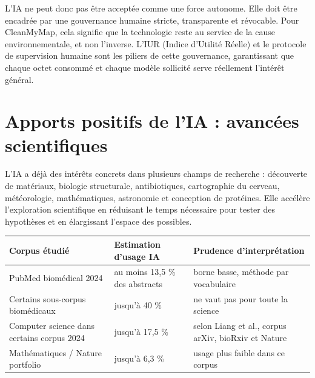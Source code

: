\documentclass[
  10pt,
  a4paper,
  DIV=11,
  numbers=noendperiod,
  oneside]{scrreprt}
\newcounter{none} %
\begin{document}
L'IA ne peut donc pas être acceptée comme une force autonome. Elle doit
être encadrée par une gouvernance humaine stricte, transparente et
révocable. Pour CleanMyMap, cela signifie que la technologie reste au
service de la cause environnementale, et non l'inverse. L'IUR (Indice
d'Utilité Réelle) et le protocole de supervision humaine sont les
piliers de cette gouvernance, garantissant que chaque octet consommé et
chaque modèle sollicité serve réellement l'intérêt général.

\section{Apports positifs de l'IA : avancées
scientifiques}\label{apports-positifs-de-lia-avancuxe9es-scientifiques}

L'IA a déjà des intérêts concrets dans plusieurs champs de recherche :
découverte de matériaux, biologie structurale, antibiotiques,
cartographie du cerveau, météorologie, mathématiques, astronomie et
conception de protéines. Elle accélère l'exploration scientifique en
réduisant le temps nécessaire pour tester des hypothèses et en
élargissant l'espace des possibles.

{\def\LTcaptype{none} %
\begin{longtable}[]{@{}
  >{\raggedright\arraybackslash}p{}
  >{\raggedleft\arraybackslash}p{}
  >{\raggedright\arraybackslash}p{}@{}}
\toprule\noalign{}
\begin{minipage}[b]{\linewidth}\raggedright
Corpus étudié
\end{minipage} & \begin{minipage}[b]{\linewidth}\raggedleft
Estimation d'usage IA
\end{minipage} & \begin{minipage}[b]{\linewidth}\raggedright
Prudence d'interprétation
\end{minipage} \\
\midrule\noalign{}
\endhead
\bottomrule\noalign{}
\endlastfoot
PubMed biomédical 2024 & au moins 13,5 \% des abstracts & borne basse,
méthode par vocabulaire \\
Certains sous-corpus biomédicaux & jusqu'à 40 \% & ne vaut pas pour
toute la science \\
Computer science dans certains corpus 2024 & jusqu'à 17,5 \% & selon
Liang et al., corpus arXiv, bioRxiv et Nature \\
Mathématiques / Nature portfolio & jusqu'à 6,3 \% & usage plus faible
dans ce corpus \\
\end{longtable}
}
\end{document}
